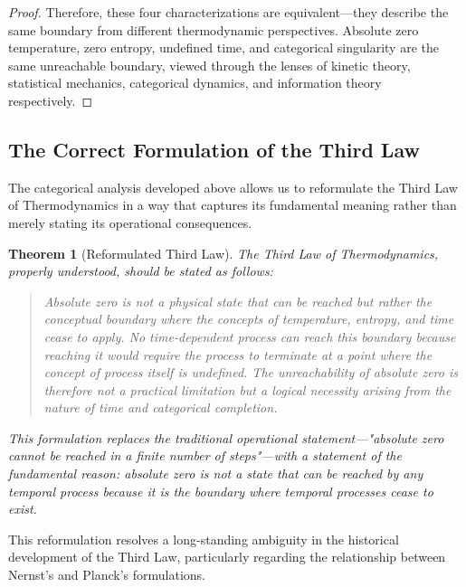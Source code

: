 \documentclass[12pt,a4paper]{article}
\newtheorem{theorem}{Theorem}[section]
\theoremstyle{definition}
\theoremstyle{remark}
\begin{document}
\begin{proof}
Therefore, these four characterizations are equivalent—they describe the same boundary from different thermodynamic perspectives. Absolute zero temperature, zero entropy, undefined time, and categorical singularity are the same unreachable boundary, viewed through the lenses of kinetic theory, statistical mechanics, categorical dynamics, and information theory respectively.
\end{proof}

\subsection{The Correct Formulation of the Third Law}

The categorical analysis developed above allows us to reformulate the Third Law of Thermodynamics in a way that captures its fundamental meaning rather than merely stating its operational consequences.

\begin{theorem}[Reformulated Third Law]
\label{thm:reformulated_third}
The Third Law of Thermodynamics, properly understood, should be stated as follows:
\begin{quote}
\textit{Absolute zero is not a physical state that can be reached but rather the conceptual boundary where the concepts of temperature, entropy, and time cease to apply. No time-dependent process can reach this boundary because reaching it would require the process to terminate at a point where the concept of process itself is undefined. The unreachability of absolute zero is therefore not a practical limitation but a logical necessity arising from the nature of time and categorical completion.}
\end{quote}
This formulation replaces the traditional operational statement—"absolute zero cannot be reached in a finite number of steps"—with a statement of the fundamental reason: absolute zero is not a state that can be reached by any temporal process because it is the boundary where temporal processes cease to exist.
\end{theorem}

This reformulation resolves a long-standing ambiguity in the historical development of the Third Law, particularly regarding the relationship between Nernst's and Planck's formulations.
\end{document}
